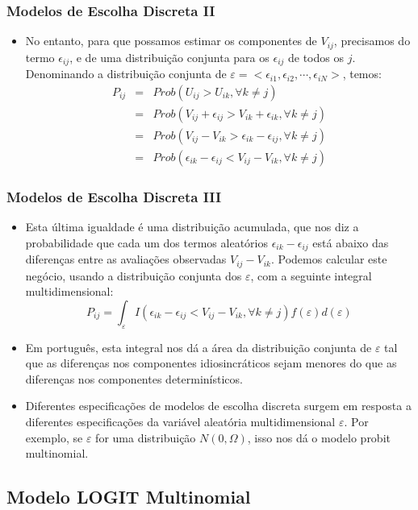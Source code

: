 \documentclass{beamer}
\begin{document}
\begin{frame}\frametitle{Modelos de Escolha Discreta II}


\begin{itemize}
\item No entanto, para que possamos estimar os componentes de $V_{ij}$,
precisamos do termo $\epsilon_{ij}$, e de uma distribuição conjunta
para os $\epsilon_{ij}$ de todos os $j$. Denominando a distribuição
conjunta de $\varepsilon=<\epsilon_{i1},\epsilon_{i2},\cdots,\epsilon_{iN}>$,
temos:
\begin{eqnarray*}
P_{ij} & = & Prob(U_{ij}>U_{ik},\forall k\neq j)\\
 & = & Prob(V_{ij}+\epsilon_{ij}>V_{ik}+\epsilon_{ik},\forall k\neq j)\\
 & = & Prob(V_{ij}-V_{ik}>\epsilon_{ik}-\epsilon_{ij},\forall k\neq j)\\
 & = & Prob(\epsilon_{ik}-\epsilon_{ij}<V_{ij}-V_{ik},\forall k\neq j)
\end{eqnarray*}
\end{itemize}
\end{frame}

\begin{frame}\frametitle{Modelos de Escolha Discreta III}
\small
\begin{itemize}
\item Esta última igualdade é uma distribuição acumulada, que nos diz a
probabilidade que cada um dos termos aleatórios $\epsilon_{ik}-\epsilon_{ij}$
está abaixo das diferenças entre as avaliações observadas $V_{ij}-V_{ik}$.
Podemos calcular este negócio, usando a distribuição conjunta dos
$\varepsilon$, com a seguinte integral multidimensional:\textrm{
\[
P_{ij}=\int_{\varepsilon}I(\epsilon_{ik}-\epsilon_{ij}<V_{ij}-V_{ik},\forall k\neq j)f(\varepsilon)d(\varepsilon)
\]
}
\item Em português, esta integral nos dá a área da distribuição conjunta
de $\varepsilon$ tal que as diferenças nos componentes idiosincráticos
sejam menores do que as diferenças nos componentes determinísticos.
\item Diferentes especificações de modelos de escolha discreta surgem em
resposta a diferentes especificações da variável aleatória multidimensional
$\varepsilon$. Por exemplo, se $\varepsilon$ for uma distribuição
$N(0,\Omega)$, isso nos dá o modelo probit multinomial.
\end{itemize}
\end{frame}


\subsection{Modelo LOGIT Multinomial}
\end{document}
